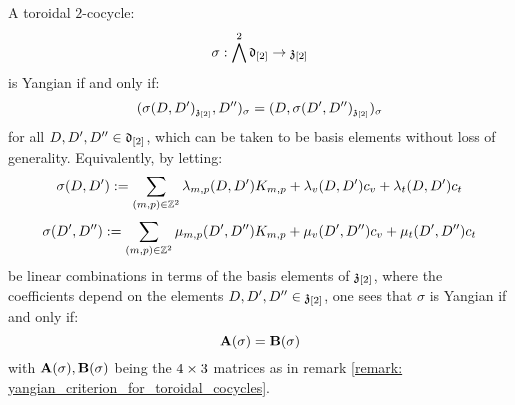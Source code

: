         \begin{theorem} \label{theorem: yangian_criterion_for_toroidal_cocycles}
            A toroidal $2$-cocycle:
                $$\sigma: \bigwedge^2 \mathfrak{d}_{[2]} \to \mathfrak{z}_{[2]}$$
            is Yangian if and only if:
                $$(\sigma(D, D')_{\mathfrak{z}_{[2]}}, D'')_{\sigma} = (D, \sigma(D', D'')_{\mathfrak{z}_{[2]}})_{\sigma}$$
            for all $D, D', D'' \in \mathfrak{d}_{[2]}$, which can be taken to be basis elements without loss of generality. Equivalently, by letting:
                $$\sigma(D, D') := \sum_{(m, p) \in \mathbb{Z}^2} \lambda_{m, p}(D, D') K_{m, p} + \lambda_v(D, D') c_v + \lambda_t(D, D') c_t$$
                $$\sigma(D', D'') := \sum_{(m, p) \in \mathbb{Z}^2} \mu_{m, p}(D', D'') K_{m, p} + \mu_v(D', D'') c_v + \mu_t(D', D'') c_t$$
            be linear combinations in terms of the basis elements of $\mathfrak{z}_{[2]}$, where the coefficients depend on the elements $D, D', D'' \in \mathfrak{z}_{[2]}$, one sees that $\sigma$ is Yangian if and only if:
                $$\mathbf{A}(\sigma) = \mathbf{B}(\sigma)$$
            with $\mathbf{A}(\sigma), \mathbf{B}(\sigma)$ being the $4 \x 3$ matrices as in remark \ref{remark: yangian_criterion_for_toroidal_cocycles}.
        \end{theorem}

